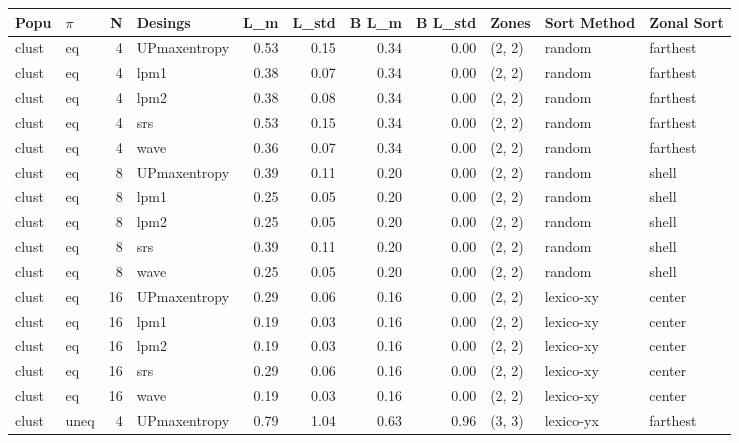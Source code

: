 \begin{tabular}{llrlrrrrlll}
\toprule
  Popu & $\pi$ &  N &      Desings &   L_m &  L_{std} &  B L_m &  B L_{std} &  Zones & Sort Method & Zonal Sort \\
\midrule
 clust &    eq &  4 & UPmaxentropy &  0.53 &     0.15 &   0.34 &       0.00 & (2, 2) &      random &   farthest \\
 clust &    eq &  4 &         lpm1 &  0.38 &     0.07 &   0.34 &       0.00 & (2, 2) &      random &   farthest \\
 clust &    eq &  4 &         lpm2 &  0.38 &     0.08 &   0.34 &       0.00 & (2, 2) &      random &   farthest \\
 clust &    eq &  4 &          srs &  0.53 &     0.15 &   0.34 &       0.00 & (2, 2) &      random &   farthest \\
 clust &    eq &  4 &         wave &  0.36 &     0.07 &   0.34 &       0.00 & (2, 2) &      random &   farthest \\
 clust &    eq &  8 & UPmaxentropy &  0.39 &     0.11 &   0.20 &       0.00 & (2, 2) &      random &      shell \\
 clust &    eq &  8 &         lpm1 &  0.25 &     0.05 &   0.20 &       0.00 & (2, 2) &      random &      shell \\
 clust &    eq &  8 &         lpm2 &  0.25 &     0.05 &   0.20 &       0.00 & (2, 2) &      random &      shell \\
 clust &    eq &  8 &          srs &  0.39 &     0.11 &   0.20 &       0.00 & (2, 2) &      random &      shell \\
 clust &    eq &  8 &         wave &  0.25 &     0.05 &   0.20 &       0.00 & (2, 2) &      random &      shell \\
 clust &    eq & 16 & UPmaxentropy &  0.29 &     0.06 &   0.16 &       0.00 & (2, 2) &   lexico-xy &     center \\
 clust &    eq & 16 &         lpm1 &  0.19 &     0.03 &   0.16 &       0.00 & (2, 2) &   lexico-xy &     center \\
 clust &    eq & 16 &         lpm2 &  0.19 &     0.03 &   0.16 &       0.00 & (2, 2) &   lexico-xy &     center \\
 clust &    eq & 16 &          srs &  0.29 &     0.06 &   0.16 &       0.00 & (2, 2) &   lexico-xy &     center \\
 clust &    eq & 16 &         wave &  0.19 &     0.03 &   0.16 &       0.00 & (2, 2) &   lexico-xy &     center \\
 clust &  uneq &  4 & UPmaxentropy &  0.79 &     1.04 &   0.63 &       0.96 & (3, 3) &   lexico-yx &   farthest \\

\end{tabular}
